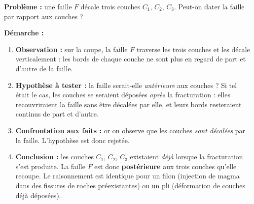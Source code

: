 \documentclass[11pt]{article}
\begin{document}
\begin{experience}
\textbf{Problème :} une faille $F$ décale trois couches $C_1$, $C_2$, $C_3$. Peut-on dater la faille par rapport aux couches ?

\textbf{Démarche :}
\begin{enumerate}
\item \textbf{Observation :} sur la coupe, la faille $F$ traverse les trois couches et les décale verticalement : les bords de chaque couche ne sont plus en regard de part et d'autre de la faille.
\item \textbf{Hypothèse à tester :} la faille serait-elle \emph{antérieure} aux couches ? Si tel était le cas, les couches se seraient déposées \emph{après} la fracturation : elles recouvriraient la faille sans être décalées par elle, et leurs bords resteraient continus de part et d'autre.
\item \textbf{Confrontation aux faits :} or on observe que les couches \emph{sont décalées} par la faille. L'hypothèse est donc rejetée.
\item \textbf{Conclusion :} les couches $C_1$, $C_2$, $C_3$ existaient \emph{déjà} lorsque la fracturation s'est produite. La faille $F$ est donc \textbf{postérieure} aux trois couches qu'elle recoupe. Le raisonnement est identique pour un filon (injection de magma dans des fissures de roches préexistantes) ou un pli (déformation de couches déjà déposées).
\end{enumerate}
\end{experience}
\end{document}
